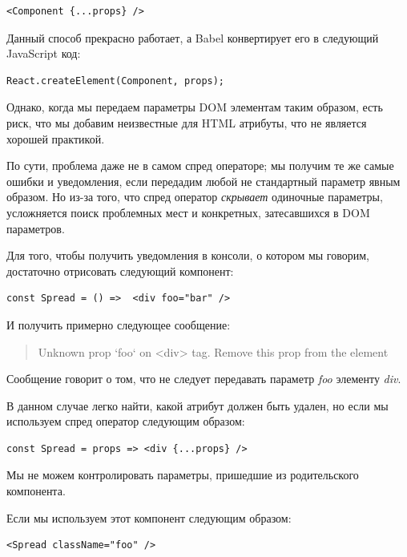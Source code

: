 \begin{lstlisting}
<Component {...props} />
\end{lstlisting} 

Данный способ прекрасно работает, а Babel конвертирует его в следующий JavaScript код:

\begin{lstlisting}
React.createElement(Component, props);
\end{lstlisting}

Однако, когда мы передаем параметры DOM элементам таким образом, есть риск, что мы добавим неизвестные для HTML атрибуты, что не является хорошей практикой. 

По сути, проблема даже не в самом спред операторе; мы получим те же самые ошибки и уведомления, если передадим любой не стандартный параметр явным образом. Но из-за того, что спред оператор \textit{скрывает} одиночные параметры, усложняется поиск проблемных мест и конкретных, затесавшихся в DOM параметров.

Для того, чтобы получить уведомления в консоли, о котором мы говорим, достаточно отрисовать следующий компонент:

\begin{lstlisting}
const Spread = () =>  <div foo="bar" />
\end{lstlisting}

И получить примерно следующее сообщение:

\begin{quotation}
Unknown prop `foo` on <div> tag. Remove this prop from the element
\end{quotation}

Сообщение говорит о том, что не следует передавать параметр \textit{foo} элементу \textit{div}.

В данном случае легко найти, какой атрибут должен быть удален, но если мы используем спред оператор следующим образом:

\begin{lstlisting}
const Spread = props => <div {...props} />	
\end{lstlisting}

Мы не можем контролировать параметры, пришедшие из родительского компонента.

Если мы используем этот компонент следующим образом:

\begin{lstlisting}
<Spread className="foo" />
\end{lstlisting}

